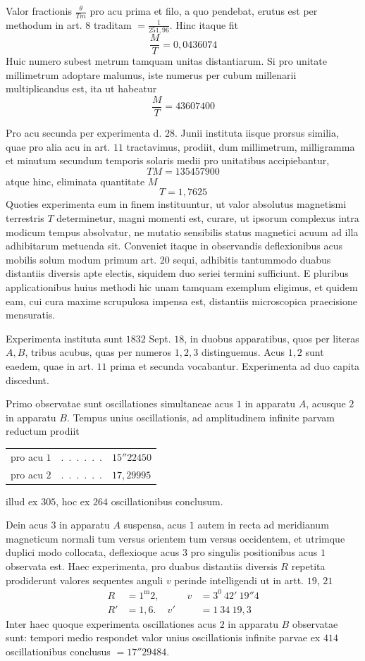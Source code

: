 Valor fractionis $\frac{\theta}{Tm}$ pro acu prima et filo, a quo pendebat, erutus est per methodum in art. $8$ traditam $=\frac{1}{251{,}96}$. Hinc itaque fit
\[
\frac MT=0{,}0436074
\]
Huic numero subest metrum tamquam unitas distantiarum. Si pro unitate millimetrum adoptare malumus, iste numerus per cubum millenarii multiplicandus est, ita ut habeatur
\[
\frac MT=43607400
\]

Pro acu secunda per experimenta d. $28$. Junii instituta iisque prorsus similia, quae pro alia acu in art. $11$ tractavimus, prodiit, dum millimetrum, milligramma et minutum secundum temporis solaris medii pro unitatibus accipiebantur,
\[
TM=135457900
\]
atque hinc, eliminata quantitate $M$
\[
T=1{,}7625
\]
Quoties experimenta eum in finem instituuntur, ut valor absolutus magnetismi terrestris $T$ determinetur, magni momenti est, curare, ut ipsorum complexus intra modicum tempus absolvatur, ne mutatio sensibilis status magnetici acuum ad illa adhibitarum metuenda sit. Conveniet itaque in observandis deflexionibus acus mobilis solum modum primum art. $20$ sequi, adhibitis tantummodo
duabus distantiis diversis apte electis, siquidem duo seriei termini sufficiunt. E pluribus applicationibus huius methodi hic unam tamquam exemplum eligimus, et quidem eam, cui cura maxime scrupulosa impensa est, distantiis microscopica praecisione mensuratis.

Experimenta instituta sunt $1832$ Sept. $18$, in duobus apparatibus, quos per literas $A,B$, tribus acubus, quas per numeros $1,2,3$ distinguemus. Acus $1,2$ sunt eaedem, quae in art. $11$ prima et secunda vocabantur. Experimenta ad duo capita discedunt.

Primo observatae sunt oscillationes simultaneae acus $1$ in apparatu $A$, acusque $2$ in apparatu $B$. Tempus unius oscillationis, ad amplitudinem infinite parvam reductum prodiit
\begin{center}
\begin{tabular}{lcl}
pro acu $1$&.\ .\ .\ .\ .\ .&$15''22450$\\
pro acu $2$&.\ .\ .\ .\ .\ .&$17{,}29995$
\end{tabular}
\end{center}
illud ex $305$, hoc ex $264$ oscillationibus conclusum.

Dein acus $3$ in apparatu $A$ suspensa, acus $1$ autem in recta ad meridianum magneticum normali tum versus orientem tum versus occidentem, et utrimque duplici modo collocata, deflexioque acus $3$ pro singulis positionibus acus $1$ observata est. Haec experimenta, pro duabus distantiis diversis $R$ repetita prodiderunt valores sequentes anguli $v$ perinde intelligendi ut in artt. $19$, $21$
\[
\begin{aligned}
R&=1^{\mathrm m}2,&\qquad v&=3^0\ 42'\ 19''4\\
R'&=1{,}6.&v'&=1\ 34\ 19{,}3
\end{aligned}
\]
Inter haec quoque experimenta oscillationes acus $2$ in apparatu $B$ observatae sunt: tempori medio respondet valor unius oscillationis infinite parvae ex $414$ oscillationibus conclusus $=17''29484$.

